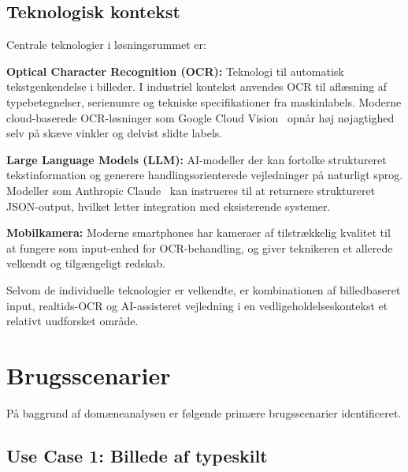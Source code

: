 \subsection{Teknologisk kontekst}
\label{subsec:teknologisk-kontekst}

Centrale teknologier i løsningsrummet er:

\textbf{Optical Character Recognition (OCR):} Teknologi til automatisk tekstgenkendelse i billeder. I industriel kontekst anvendes OCR til aflæsning af typebetegnelser, serienumre og tekniske specifikationer fra maskinlabels. Moderne cloud-baserede OCR-løsninger som Google Cloud Vision~\cite{google_vision} opnår høj nøjagtighed selv på skæve vinkler og delvist slidte labels.

\textbf{Large Language Models (LLM):} AI-modeller der kan fortolke struktureret tekstinformation og generere handlingsorienterede vejledninger på naturligt sprog. Modeller som Anthropic Claude~\cite{anthropic_claude} kan instrueres til at returnere struktureret JSON-output, hvilket letter integration med eksisterende systemer.

\textbf{Mobilkamera:} Moderne smartphones har kameraer af tilstrækkelig kvalitet til at fungere som input-enhed for OCR-behandling, og giver teknikeren et allerede velkendt og tilgængeligt redskab.

Selvom de individuelle teknologier er velkendte, er kombinationen af billedbaseret input, realtids-OCR og AI-assisteret vejledning i en vedligeholdelseskontekst et relativt uudforsket område.

\section{Brugsscenarier}
\label{sec:brugsscenarier}

På baggrund af domæneanalysen er følgende primære brugsscenarier identificeret.

\subsection{Use Case 1: Billede af typeskilt}

